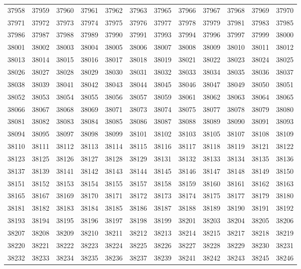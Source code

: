 \begin{center}
\begin{longtable}{llllllllllll}
37958 &37959 &37960 &37961 &37962 &37963 &37965 &37966 &37967 &37968 &37969 &37970 \\
37971 &37972 &37973 &37974 &37975 &37976 &37977 &37978 &37979 &37981 &37983 &37985 \\
37986 &37987 &37988 &37989 &37990 &37991 &37993 &37994 &37996 &37997 &37999 &38000 \\
38001 &38002 &38003 &38004 &38005 &38006 &38007 &38008 &38009 &38010 &38011 &38012 \\
38013 &38014 &38015 &38016 &38017 &38018 &38019 &38021 &38022 &38023 &38024 &38025 \\
38026 &38027 &38028 &38029 &38030 &38031 &38032 &38033 &38034 &38035 &38036 &38037 \\
38038 &38039 &38041 &38042 &38043 &38044 &38045 &38046 &38047 &38049 &38050 &38051 \\
38052 &38053 &38054 &38055 &38056 &38057 &38059 &38061 &38062 &38063 &38064 &38065 \\
38066 &38067 &38068 &38069 &38071 &38073 &38074 &38075 &38077 &38078 &38079 &38080 \\
38081 &38082 &38083 &38084 &38085 &38086 &38087 &38088 &38089 &38090 &38091 &38093 \\
38094 &38095 &38097 &38098 &38099 &38101 &38102 &38103 &38105 &38107 &38108 &38109 \\
38110 &38111 &38112 &38113 &38114 &38115 &38116 &38117 &38118 &38119 &38121 &38122 \\
38123 &38125 &38126 &38127 &38128 &38129 &38131 &38132 &38133 &38134 &38135 &38136 \\
38137 &38139 &38141 &38142 &38143 &38144 &38145 &38146 &38147 &38148 &38149 &38150 \\
38151 &38152 &38153 &38154 &38155 &38157 &38158 &38159 &38160 &38161 &38162 &38163 \\
38165 &38167 &38169 &38170 &38171 &38172 &38173 &38174 &38175 &38177 &38179 &38180 \\
38181 &38182 &38183 &38184 &38185 &38186 &38187 &38188 &38189 &38190 &38191 &38192 \\
38193 &38194 &38195 &38196 &38197 &38198 &38199 &38201 &38203 &38204 &38205 &38206 \\
38207 &38208 &38209 &38210 &38211 &38212 &38213 &38214 &38215 &38217 &38218 &38219 \\
38220 &38221 &38222 &38223 &38224 &38225 &38226 &38227 &38228 &38229 &38230 &38231 \\
38232 &38233 &38234 &38235 &38236 &38237 &38239 &38241 &38242 &38243 &38245 &38246 \\

\end{longtable}
\end{center}
